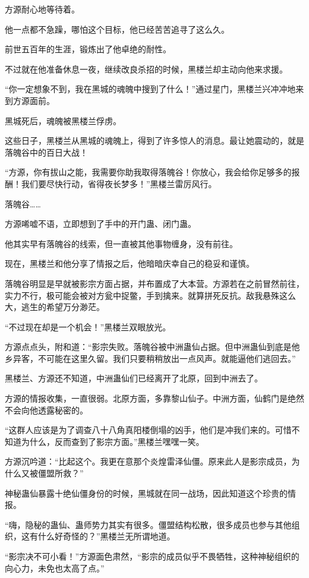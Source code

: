 \begin{this_body}
方源耐心地等待着。

他一点都不急躁，哪怕这个目标，他已经苦苦追寻了这么久。

前世五百年的生涯，锻炼出了他卓绝的耐性。

不过就在他准备休息一夜，继续改良杀招的时候，黑楼兰却主动向他来求援。

“你一定想象不到，我在黑城的魂魄中搜到了什么！”通过星门，黑楼兰兴冲冲地来到方源面前。

黑城死后，魂魄被黑楼兰俘虏。

这些日子，黑楼兰从黑城的魂魄上，得到了许多惊人的消息。最让她震动的，就是落魄谷中的百日大战！

“方源，你有拔山之能，我需要你助我取得落魄谷！你放心，我会给你足够多的报酬！我们要尽快行动，省得夜长梦多！”黑楼兰雷厉风行。

落魄谷……

方源唏嘘不语，立即想到了手中的开门蛊、闭门蛊。

他其实早有落魄谷的线索，但一直被其他事物缠身，没有前往。

现在，黑楼兰和他分享了情报之后，他暗暗庆幸自己的稳妥和谨慎。

落魄谷明显是早就被影宗方面占据，并布置成了大本营。方源若在之前冒然前往，实力不行，极可能会被对方瓮中捉鳖，手到擒来。就算拼死反抗。敌我悬殊这么大，逃生的希望万分渺茫。

“不过现在却是一个机会！”黑楼兰双眼放光。

方源点点头，附和道：“影宗失败。落魄谷被中洲蛊仙占据。但中洲蛊仙到底是他乡异客，不可能在这里久留。我们只要稍稍放出一点风声。就能逼他们逃回去。”

黑楼兰、方源还不知道，中洲蛊仙们已经离开了北原，回到中洲去了。

方源的情报收集，一直很弱。北原方面，多靠黎山仙子。中洲方面，仙鹤门是绝然不会向他透露秘密的。

“这群人应该是为了调查八十八角真阳楼倒塌的凶手，他们是冲我们来的。可惜不知道为什么，反而查到了影宗方面。”黑楼兰嘿嘿一笑。

方源沉吟道：“比起这个。我更在意那个炎煌雷泽仙僵。原来此人是影宗成员，为什么又被僵盟所救？”

神秘蛊仙暴露十绝仙僵身份的时候，黑城就在同一战场，因此知道这个珍贵的情报。

“嗨，隐秘的蛊仙、蛊师势力其实有很多。僵盟结构松散，很多成员也参与其他组织，这有什么好奇怪的？”黑楼兰无所谓地道。

“影宗决不可小看！”方源面色肃然，“影宗的成员似乎不畏牺牲，这种神秘组织的向心力，未免也太高了点。”


\end{this_body}
